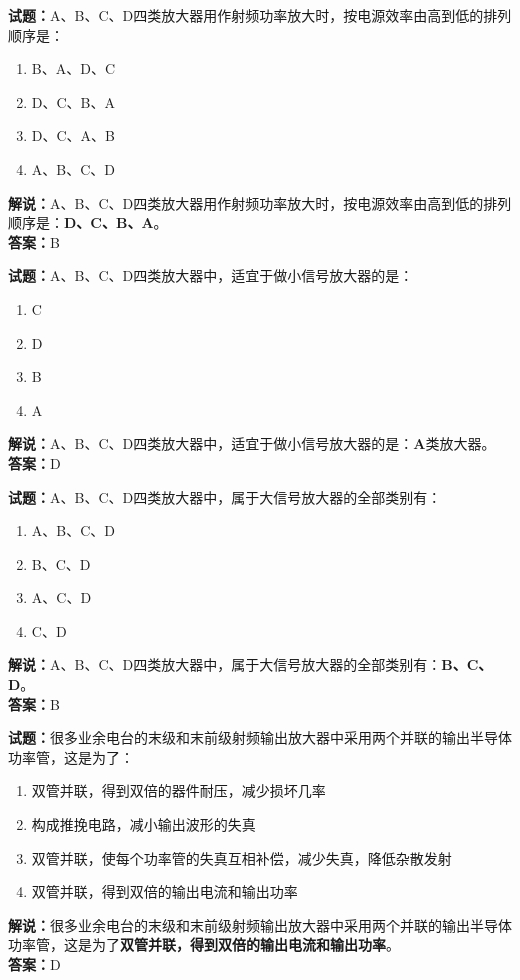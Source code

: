 \documentclass{ctexbook}
\begin{document}
\bigskip


\noindent\textbf{试题：}A、B、C、D四类放大器用作射频功率放大时，按电源效率由高到低的排列顺序是：
\begin{enumerate}[leftmargin=3em]
\item B、A、D、C
\item D、C、B、A
\item D、C、A、B
\item A、B、C、D
\end{enumerate}
\noindent\textbf{解说：}A、B、C、D四类放大器用作射频功率放大时，按电源效率由高到低的排列顺序是：\textbf{D、C、B、A}。\\\noindent\textbf{答案：}B





\bigskip


\noindent\textbf{试题：}A、B、C、D四类放大器中，适宜于做小信号放大器的是：
\begin{enumerate}[leftmargin=3em]
\item C
\item D
\item B
\item A
\end{enumerate}
\noindent\textbf{解说：}A、B、C、D四类放大器中，适宜于做小信号放大器的是：\textbf{A}类放大器。\\\noindent\textbf{答案：}D






\bigskip


\noindent\textbf{试题：}A、B、C、D四类放大器中，属于大信号放大器的全部类别有：
\begin{enumerate}[leftmargin=3em]
\item A、B、C、D
\item B、C、D
\item A、C、D
\item C、D
\end{enumerate}
\noindent\textbf{解说：}A、B、C、D四类放大器中，属于大信号放大器的全部类别有：\textbf{B、C、D}。\\\noindent\textbf{答案：}B





\bigskip


\noindent\textbf{试题：}很多业余电台的末级和末前级射频输出放大器中采用两个并联的输出半导体功率管，这是为了：
\begin{enumerate}[leftmargin=3em]
\item 双管并联，得到双倍的器件耐压，减少损坏几率
\item 构成推挽电路，减小输出波形的失真
\item 双管并联，使每个功率管的失真互相补偿，减少失真，降低杂散发射
\item 双管并联，得到双倍的输出电流和输出功率
\end{enumerate}
\noindent\textbf{解说：}很多业余电台的末级和末前级射频输出放大器中采用两个并联的输出半导体功率管，这是为了\textbf{双管并联，得到双倍的输出电流和输出功率}。\\\noindent\textbf{答案：}D
\end{document}
